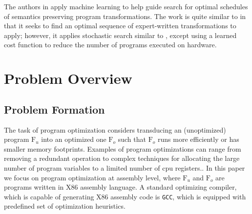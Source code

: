 \documentclass{article}
\newcommand\p{\ensuremath{{\mathrm{F}_u}}}
\newcommand\popt{\ensuremath{{\mathrm{F}_o}}}
\begin{document}
The authors in \cite{chen2018learning} apply machine learning to help guide search for optimal schedules of semantics preserving program transformations. The work is quite similar to \cite{chen2019learning} in that it seeks to find an optimal sequence of expert-written transformations to apply; however, it applies stochastic search similar to \cite{schkufza2013stochastic}, except using a learned cost function to reduce the number of programs executed on hardware. 

\section{Problem Overview}

\subsection{Problem Formation}

The task of program optimization considers transducing an (unoptimized) program $\p$ into an optimized one $\popt$ such that $\popt$ runs more efficiently or has smaller memory footprints.
Examples of program optimizations can range from removing a redundant operation to complex techniques for allocating the large number of program variables to a limited number of cpu registers.. 
In this paper we focus on program optimization at assembly level, where $\p$ and $\popt$ are programs written in X86 assembly language.
A standard optimizing compiler, which is capable of generating X86 assembly code is \texttt{GCC}, which is equipped with predefined set of optimization heuristics.
\end{document}
